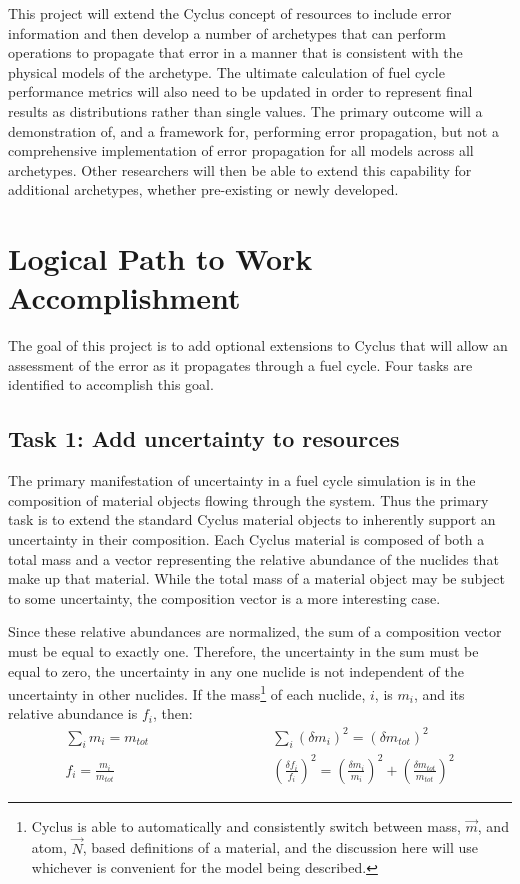 \documentclass[dvips,12pt]{article}
\newcommand{\unc}[1]
{ \delta #1 }
\newcommand{\uncsq}[1]
{ \left(\unc{#1}\right)^2 }
\newcommand{\uncratio}[1]
{ \left(\frac{\unc{#1}}{#1}\right) }
\newcommand{\uncratiosq}[1]
{ \uncratio{#1}^2 }
\begin{document}
This project
will extend the Cyclus concept of resources to
include error information and then develop a
number of archetypes that can perform operations
to propagate that error in a manner that is 
consistent with the physical models of the 
archetype.
The ultimate calculation of fuel cycle performance
metrics will also need to be updated in order to
represent final results as distributions rather
than single values.  The primary outcome will
a demonstration of, and a
framework for, performing error propagation,
but not a comprehensive implementation of error
propagation for all models across all archetypes.
Other researchers will then be able to extend
this capability for additional archetypes, 
whether pre-existing or newly developed.

\section{Logical Path to Work Accomplishment}
The goal of this project is to add optional
extensions to Cyclus that will allow an assessment
of the error as it propagates through a fuel
cycle.  Four tasks are identified to accomplish
this goal.


\subsection{Task 1: Add uncertainty to resources}

The primary manifestation of uncertainty in a fuel
cycle simulation is in the composition of material
objects flowing through the system.  Thus the
primary task is to extend the standard Cyclus
material objects to inherently support an
uncertainty in their composition.  Each Cyclus
material is composed of both a total mass and a
vector representing the relative abundance of the
nuclides that make up that material.  While the
total mass of a material object may be subject to
some uncertainty, the composition vector is a more
interesting case.

Since these relative abundances are normalized,
the sum of a composition vector must be equal to
exactly one. Therefore, the uncertainty in the sum
must be equal to zero, the uncertainty in any one
nuclide is not independent of the uncertainty in
other nuclides.  If the mass\footnote{Cyclus 
is able to automatically and consistently switch
between mass, $\vec{m}$, and atom, $\vec{N}$, based
 definitions of a
material, and the discussion here will use 
whichever is convenient for the model being 
described.}
 of each nuclide, $i$,
is $m_i$, and its relative abundance is $f_i$,
then:
\begin{align*}
  \sum_i m_i = m_{tot} \qquad\qquad&\qquad\qquad  
       \sum_i \uncsq{m_i} = \uncsq{m_{tot}}\\
  f_i = \frac{m_i}{m_{tot}} \qquad\qquad&\qquad\qquad  
       \uncratiosq{f_i} = \uncratiosq{m_i} + \uncratiosq{m_{tot}}
\end{align*}
\end{document}
